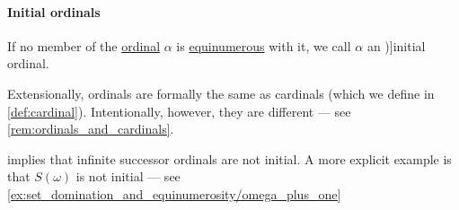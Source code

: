 \paragraph{Initial ordinals}

\begin{definition}\label{def:initial_ordinal}
  If no member of the \hyperref[def:ordinal]{ordinal} \( \alpha \) is \hyperref[def:equinumerosity]{equinumerous} with it, we call \( \alpha \) an \term[ru=initial ordinal (\cite[199]{Enderton1977SetTheory})]{initial ordinal}.
\end{definition}
\begin{comments}
  \item Extensionally, ordinals are formally the same as cardinals (which we define in \cref{def:cardinal}). Intentionally, however, they are different --- see \cref{rem:ordinals_and_cardinals}.

  \item {} implies that infinite successor ordinals are not initial. A more explicit example is that \( S(\omega) \) is not initial --- see \cref{ex:set_domination_and_equinumerosity/omega_plus_one}
\end{comments}

